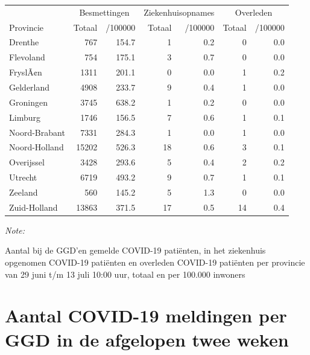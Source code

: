 \documentclass[
  english,
  man,floatsintext]{apa6}
\begin{document}
\begin{table}
\centering
\begin{threeparttable}
\begin{tabular}{lrrrrrr}
\toprule
\multicolumn{1}{c}{ } & \multicolumn{2}{c}{Besmettingen} & \multicolumn{2}{c}{Ziekenhuisopnames} & \multicolumn{2}{c}{Overleden} \\
\cmidrule(l{3pt}r{3pt}){2-3} \cmidrule(l{3pt}r{3pt}){4-5} \cmidrule(l{3pt}r{3pt}){6-7}
Provincie & Totaal & /100000 & Totaal & /100000 & Totaal & /100000\\
\midrule
Drenthe & 767 & 154.7 & 1 & 0.2 & 0 & 0.0\\
Flevoland & 754 & 175.1 & 3 & 0.7 & 0 & 0.0\\
FryslÃ¢n & 1311 & 201.1 & 0 & 0.0 & 1 & 0.2\\
Gelderland & 4908 & 233.7 & 9 & 0.4 & 1 & 0.0\\
Groningen & 3745 & 638.2 & 1 & 0.2 & 0 & 0.0\\
Limburg & 1746 & 156.5 & 7 & 0.6 & 1 & 0.1\\
Noord-Brabant & 7331 & 284.3 & 1 & 0.0 & 1 & 0.0\\
Noord-Holland & 15202 & 526.3 & 18 & 0.6 & 3 & 0.1\\
Overijssel & 3428 & 293.6 & 5 & 0.4 & 2 & 0.2\\
Utrecht & 6719 & 493.2 & 9 & 0.7 & 1 & 0.1\\
Zeeland & 560 & 145.2 & 5 & 1.3 & 0 & 0.0\\
Zuid-Holland & 13863 & 371.5 & 17 & 0.5 & 14 & 0.4\\
\bottomrule
\end{tabular}
\begin{tablenotes}
\item \textit{Note: } 
\item Aantal bij de GGD’en gemelde COVID-19 patiënten, in het ziekenhuis opgenomen COVID-19 patiënten en overleden COVID-19 patiënten per provincie van 29 juni t/m 13 juli 10:00 uur, totaal en per 100.000 inwoners
\end{tablenotes}
\end{threeparttable}
\end{table}

\newpage

\hypertarget{aantal-covid-19-meldingen-per-ggd-in-de-afgelopen-twee-weken}{%
\section{Aantal COVID-19 meldingen per GGD in de afgelopen twee weken}\label{aantal-covid-19-meldingen-per-ggd-in-de-afgelopen-twee-weken}}
\end{document}
